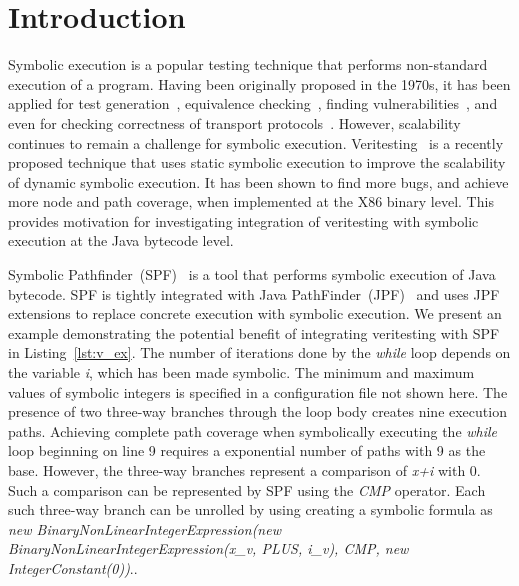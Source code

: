 \section{Introduction}
Symbolic execution is a popular testing technique that performs non-standard execution of a program.
%
Having been originally proposed in the 1970s, it has been applied for test generation~\cite{dart,cute}, equivalence checking~\cite{ramos,adaptorsynth}, finding vulnerabilities~\cite{driller,angr}, and even for checking correctness of transport protocols~\cite{transport}.
%
However, scalability continues to remain a challenge for symbolic execution.
%
Veritesting~\cite{veritesting} is a recently proposed technique that uses static symbolic execution to improve the scalability of dynamic symbolic execution.
%
It has been shown to find more bugs, and achieve more node and path coverage, when implemented at the X86 binary level.
%
This provides motivation for investigating integration of veritesting with symbolic execution at the Java bytecode level.



Symbolic Pathfinder~(SPF)~\cite{spf} is a tool that performs symbolic execution of Java bytecode.
%
SPF is tightly integrated with Java PathFinder~(JPF)~\cite{jpf} and uses JPF extensions to replace concrete execution with symbolic execution.
%
We present an example demonstrating the potential benefit of integrating veritesting with SPF in Listing~\ref{lst:v_ex}.
%
The number of iterations done by the \textit{while} loop depends on the variable \textit{i}, which has been made symbolic.
%
The minimum and maximum values of symbolic integers is specified in a configuration file not shown here.
%
The presence of two three-way branches through the loop body creates nine execution paths.
%
Achieving complete path coverage when symbolically executing the \textit{while} loop beginning on line 9 requires a exponential number of paths with 9 as the base.
%
However, the three-way branches represent a comparison of \textit{x+i} with 0.
%
Such a comparison can be represented by SPF using the \textit{CMP} operator.
%
Each such three-way branch can be unrolled by using creating a symbolic formula as \textit{new BinaryNonLinearIntegerExpression(new BinaryNonLinearIntegerExpression(x\_v, PLUS, i\_v), CMP, new IntegerConstant(0))}..

